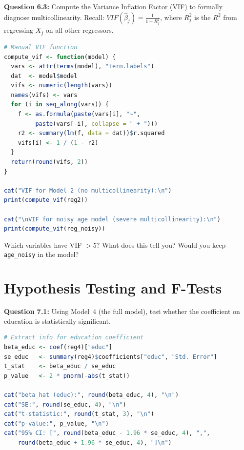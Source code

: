 \documentclass[11pt,letterpaper]{article}
\begin{document}
\vspace{3cm}

\textbf{Question 6.3:} Compute the Variance Inflation Factor (VIF) to formally diagnose multicollinearity. Recall: $VIF(\hat{\beta}_j) = \frac{1}{1 - R_j^2}$, where $R_j^2$ is the $R^2$ from regressing $X_j$ on all other regressors.

\begin{lstlisting}[language=R]
# Manual VIF function
compute_vif <- function(model) {
  vars <- attr(terms(model), "term.labels")
  dat  <- model$model
  vifs <- numeric(length(vars))
  names(vifs) <- vars
  for (i in seq_along(vars)) {
    f <- as.formula(paste(vars[i], "~",
         paste(vars[-i], collapse = " + ")))
    r2 <- summary(lm(f, data = dat))$r.squared
    vifs[i] <- 1 / (1 - r2)
  }
  return(round(vifs, 2))
}

cat("VIF for Model 2 (no multicollinearity):\n")
print(compute_vif(reg2))

cat("\nVIF for noisy age model (severe multicollinearity):\n")
print(compute_vif(reg_noisy))
\end{lstlisting}

Which variables have VIF $> 5$? What does this tell you? Would you keep \texttt{age\_noisy} in the model?

\vspace{3cm}

\newpage

\section{Hypothesis Testing and F-Tests}

\textbf{Question 7.1:} Using Model~4 (the full model), test whether the coefficient on education is statistically significant.

\begin{lstlisting}[language=R]
# Extract info for education coefficient
beta_educ <- coef(reg4)["educ"]
se_educ   <- summary(reg4)$coefficients["educ", "Std. Error"]
t_stat    <- beta_educ / se_educ
p_value   <- 2 * pnorm(-abs(t_stat))

cat("beta_hat (educ):", round(beta_educ, 4), "\n")
cat("SE:", round(se_educ, 4), "\n")
cat("t-statistic:", round(t_stat, 3), "\n")
cat("p-value:", p_value, "\n")
cat("95% CI: [", round(beta_educ - 1.96 * se_educ, 4), ",",
    round(beta_educ + 1.96 * se_educ, 4), "]\n")
\end{lstlisting}
\end{document}

